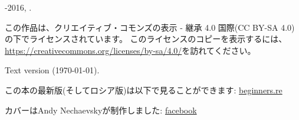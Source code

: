 ﻿\begin{titlepage}


\end{titlepage}

\newpage

\begin{center}
\vspace*{\fill}
{\LARGE \TITLE}

\vspace*{\fill}

{\large \AUTHOR}

{\large \TT{<\EMAIL>}}
\vspace*{\fill}
\vfill

\ccbysa

-2016, \AUTHOR. 

この作品は、クリエイティブ・コモンズの表示 - 継承 4.0 国際(CC BY-SA 4.0)の下でライセンスされています。
このライセンスのコピーを表示するには、\url{https://creativecommons.org/licenses/by-sa/4.0/}を訪れてください。

Text version ({\large \today}).

この本の最新版(そしてロシア版)は以下で見ることができます: \href{http://go.yurichev.com/17009}{beginners.re}

カバーはAndy Nechaevskyが制作しました: \href{http://go.yurichev.com/17023}{facebook}

\end{center}
